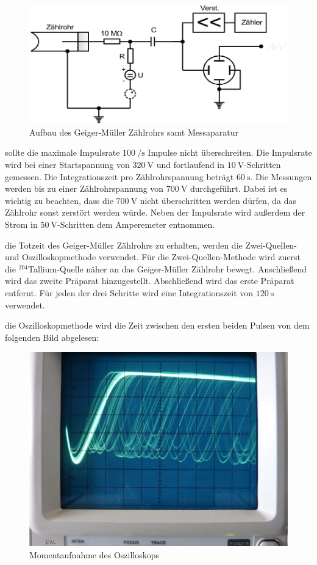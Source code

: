     \begin{figure}[H]
        \centering
        \includegraphics[width=\linewidth]{images/Aufbau.jpg}
        \caption{Aufbau des Geiger-Müller Zählrohrs samt Messaparatur \cite{V703}}
        \label{fig:5}
    \end{figure}

    \justifying sollte die maximale Impulsrate $\SI{100}{\per\second}$ Impulse nicht überschreiten. Die Impulsrate wird
    bei einer Startspannung von $\SI{320}{\volt}$ und fortlaufend in $\SI{10}{\volt}$-Schritten gemessen. Die Integrationszeit pro 
    Zählrohrspannung beträgt $\SI{60}{\second}$. Die Messungen werden bis zu einer Zählrohrspannung von $\SI{700}{\volt}$ durchgeführt. Dabei
    ist es wichtig zu beachten, dass die $\SI{700}{\volt}$ nicht überschritten werden dürfen, da das Zählrohr sonst zerstört werden würde.
    Neben der Impulsrate wird außerdem der Strom in $\SI{50}{\volt}$-Schritten dem Amperemeter entnommen.

    \justifying die Totzeit des Geiger-Müller Zählrohrs zu erhalten, werden die Zwei-Quellen- und Oszilloskopmethode verwendet. 
    Für die Zwei-Quellen-Methode wird zuerst die $^{204}$Tallium-Quelle näher an das Geiger-Müller Zählrohr bewegt. Anschließend wird das zweite 
    Präparat hinzugestellt. Abschließend wird das erste Präparat entfernt. Für jeden der drei Schritte wird eine Integrationszeit von $\SI{120}
    {\second}$ verwendet. 

    \justifying die Oszilloskopmethode wird die Zeit zwischen den ersten beiden Pulsen von dem folgenden Bild abgelesen:

    \begin{figure}[H]
        \centering
        \includegraphics[width=0.75\linewidth]{images/Oszilloskop.jpg}
        \caption{Momentaufnahme des Oszilloskops \cite{V703}}
        \label{fig:6}
    \end{figure}

